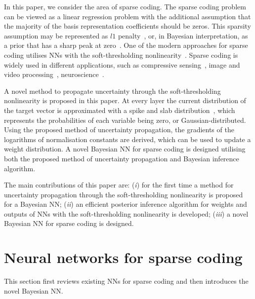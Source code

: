 \documentclass{article}
\begin{document}
  In this paper, we consider the area of sparse coding. The sparse coding problem can be viewed as a linear regression problem with the additional assumption that the majority of the basis representation coefficients should be zeros. This sparsity assumption may be represented as $l1$ penalty~\cite{tibshirani1996regression}, or, in Bayesian interpretation, as a prior that has a sharp peak at zero~\cite{tipping2001sparse}. One of the modern approaches for sparse coding utilises NNs with the soft-thresholding nonlinearity~\cite{gregor2010learning, sprechmann2015learning}. Sparse coding is widely used in different applications, such as compressive sensing~\cite{candes2008introduction}, image and video processing~\cite{mairal2014sparse, wang2015deep}, neuroscience~\cite{baillet1997bayesian, jas2017learning}.

  A novel method to propagate uncertainty through the soft-thresholding nonlinearity is proposed in this paper. At every layer the current distribution of the target vector is approximated with a spike and slab distribution~\cite{mitchell1988bayesian}, which represents the probabilities of each variable being zero, or Gaussian-distributed. Using the proposed method of uncertainty propagation, the gradients of the logarithms of normalisation constants are derived, which can be used to update a weight distribution. A novel Bayesian NN for sparse coding is designed utilising both the proposed method of uncertainty propagation and Bayesian inference algorithm.

  The main contributions of this paper are: (\textit{i}) for the first time a method for uncertainty propagation through the soft-thresholding nonlinearity is proposed for a Bayesian NN; (\textit{ii}) an efficient posterior inference algorithm for weights and outputs of NNs with the soft-thresholding nonlinearity is developed; (\textit{iii}) a novel Bayesian NN for sparse coding is designed.


\section{Neural networks for sparse coding}
  \label{sec:bayesian_lista}
  This section first reviews existing NNs for sparse coding and then introduces the novel Bayesian NN.
  
\end{document}
